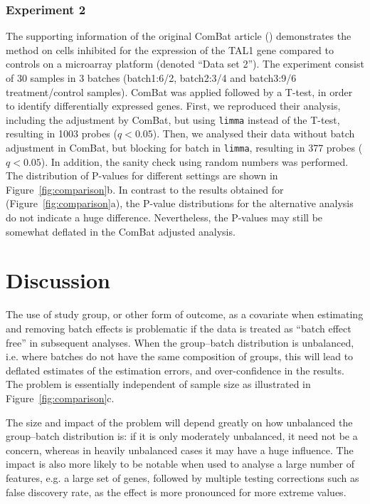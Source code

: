 \documentclass{bio}
\begin{document}
\subsubsection{Experiment 2}

The supporting information of the original ComBat article (\citealp{Johnson2007}) demonstrates the method on cells inhibited for the expression of the TAL1 gene compared to controls on a microarray platform (denoted ``Data set 2''). The experiment consist of 30 samples in 3 batches (batch1:6/2, batch2:3/4 and batch3:9/6 treatment/control samples). ComBat was applied followed by a T-test, in order to identify differentially expressed genes. First, we reproduced their analysis, including the adjustment by ComBat, but using \texttt{limma} instead of the T-test, resulting in 1003 probes ($q<0.05$).  Then, we analysed their data without batch adjustment in ComBat, but blocking for batch in \texttt{limma}, resulting in 377 probes ($q<0.05$). In addition, the sanity check using random numbers was performed. The distribution of P-values for different settings are shown in Figure~\ref{fig:comparison}b. In contrast to the results obtained for \citet{Towfic2014} (Figure~\ref{fig:comparison}a), the P-value distributions for the alternative analysis do not indicate a huge difference. Nevertheless, the P-values may still be somewhat deflated in the ComBat adjusted analysis.


\section{Discussion}

The use of study group, or other form of outcome, as a covariate when estimating and removing batch effects is problematic if the data is treated as ``batch effect free'' in subsequent analyses. When the group--batch distribution is unbalanced, i.e. where batches do not have the same composition of groups, this will lead to deflated estimates of the estimation errors, and over-confidence in the results. The problem is essentially independent of sample size as illustrated in Figure~\ref{fig:comparison}c.

The size and impact of the problem will depend greatly on how unbalanced the group--batch distribution is: if it is only moderately unbalanced, it need not be a concern, whereas in heavily unbalanced cases it may have a huge influence. The impact is also more likely to be notable when used to analyse a large number of features, e.g. a large set of genes, followed by multiple testing corrections such as false discovery rate, as the effect is more pronounced for more extreme values.
\end{document}
